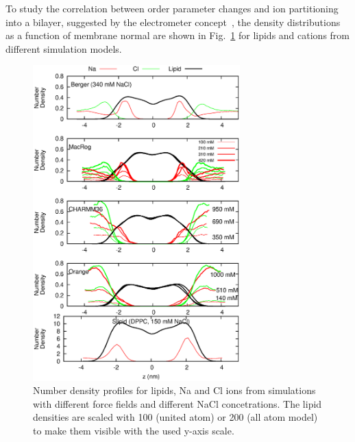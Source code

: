 \documentclass[pre,aps,floatfix,authordate1-4,twocolumn]{revtex4-1}
\begin{document}
To study the correlation between order parameter changes and ion partitioning into a bilayer, 
suggested by the electrometer concept~\cite{akutsu81,altenbach84,seelig87,scherer89}, the density distributions as a function of membrane normal 
are shown in Fig.~\ref{IONdensCOMP} for lipids and cations from different simulation models. 
\begin{figure}[]
  \centering
  \includegraphics[width=8cm]{../Fig/NAdensities.eps}
  \caption{\label{IONdensCOMP}
    Number density profiles for lipids, Na and Cl ions from simulations with different force fields and different NaCl concetrations. 
    The lipid densities are scaled with 100 (united atom) or 200 (all atom model) to make them visible with the used y-axis scale.
  }
\end{figure}
\end{document}
